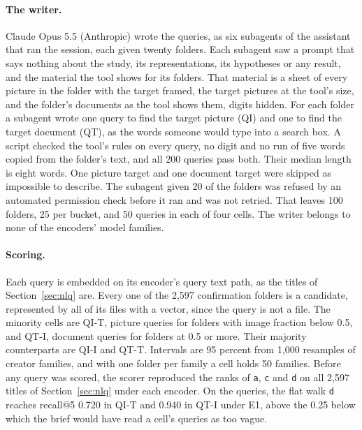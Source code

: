 \documentclass[11pt]{article}
\newcommand{\rep}[1]{\texttt{#1}}
\begin{document}
\paragraph{The writer.} Claude Opus 5.5 (Anthropic) wrote the queries, as six subagents of the assistant that ran the session, each given twenty folders. Each subagent saw a prompt that says nothing about the study, its representations, its hypotheses or any result, and the material the tool shows for its folders. That material is a sheet of every picture in the folder with the target framed, the target pictures at the tool's size, and the folder's documents as the tool shows them, digits hidden. For each folder a subagent wrote one query to find the target picture (QI) and one to find the target document (QT), as the words someone would type into a search box. A script checked the tool's rules on every query, no digit and no run of five words copied from the folder's text, and all 200 queries pass both. Their median length is eight words. One picture target and one document target were skipped as impossible to describe. The subagent given 20 of the folders was refused by an automated permission check before it ran and was not retried. That leaves 100 folders, 25 per bucket, and 50 queries in each of four cells. The writer belongs to none of the encoders' model families.

\paragraph{Scoring.} Each query is embedded on its encoder's query text path, as the titles of Section~\ref{sec:nlq} are. Every one of the 2,597 confirmation folders is a candidate, represented by all of its files with a vector, since the query is not a file. The minority cells are QI-T, picture queries for folders with image fraction below 0.5, and QT-I, document queries for folders at 0.5 or more. Their majority counterparts are QI-I and QT-T. Intervals are 95 percent from 1,000 resamples of creator families, and with one folder per family a cell holds 50 families. Before any query was scored, the scorer reproduced the ranks of \rep{a}, \rep{c} and \rep{d} on all 2,597 titles of Section~\ref{sec:nlq} under each encoder. On the queries, the flat walk \rep{d} reaches recall@5 0.720 in QI-T and 0.940 in QT-I under E1, above the 0.25 below which the brief would have read a cell's queries as too vague.
\end{document}
